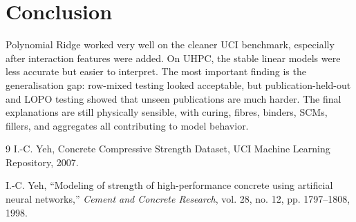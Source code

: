 \documentclass{article}
\begin{document}
\section{Conclusion}
Polynomial Ridge worked very well on the cleaner UCI benchmark, especially after interaction features were added. On UHPC, the stable linear models were less accurate but easier to interpret. The most important finding is the generalisation gap: row-mixed testing looked acceptable, but publication-held-out and LOPO testing showed that unseen publications are much harder. The final explanations are still physically sensible, with curing, fibres, binders, SCMs, fillers, and aggregates all contributing to model behavior.

\begin{thebibliography}{9}
I.-C. Yeh, Concrete Compressive Strength Dataset, UCI Machine Learning Repository, 2007.

I.-C. Yeh, ``Modeling of strength of high-performance concrete using artificial neural networks,'' \textit{Cement and Concrete Research}, vol. 28, no. 12, pp. 1797--1808, 1998.
\end{thebibliography}
\end{document}
